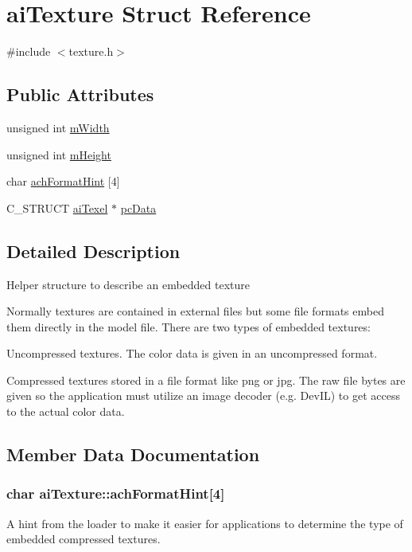 \hypertarget{structai_texture}{\section{ai\-Texture Struct Reference}
\label{structai_texture}
}


{\ttfamily \#include $<$texture.\-h$>$}

\subsection*{Public Attributes}
\begin{DoxyCompactItemize}
\item 
unsigned int \hyperlink{structai_texture_aaa3ad8cfe44fdc4dea2db91977d92234}{m\-Width}
\item 
unsigned int \hyperlink{structai_texture_ac1e2fa6f1f646e9c55e3985d4418a752}{m\-Height}
\item 
char \hyperlink{structai_texture_aa9f44996acf3b301bfeb4e5348311540}{ach\-Format\-Hint} \mbox{[}4\mbox{]}
\item 
C\-\_\-\-S\-T\-R\-U\-C\-T \hyperlink{structai_texel}{ai\-Texel} $\ast$ \hyperlink{structai_texture_aeb07528748b6e49d2d81c60006024f9a}{pc\-Data}
\end{DoxyCompactItemize}


\subsection{Detailed Description}
Helper structure to describe an embedded texture

Normally textures are contained in external files but some file formats embed them directly in the model file. There are two types of embedded textures\-:
\begin{DoxyEnumerate}
\item Uncompressed textures. The color data is given in an uncompressed format.
\item Compressed textures stored in a file format like png or jpg. The raw file bytes are given so the application must utilize an image decoder (e.\-g. Dev\-I\-L) to get access to the actual color data. 
\end{DoxyEnumerate}

\subsection{Member Data Documentation}
\hypertarget{structai_texture_aa9f44996acf3b301bfeb4e5348311540}{
\subsubsection[{ach\-Format\-Hint}]{\setlength{\rightskip}{0pt plus 5cm}char ai\-Texture\-::ach\-Format\-Hint\mbox{[}4\mbox{]}}}\label{structai_texture_aa9f44996acf3b301bfeb4e5348311540}
A hint from the loader to make it easier for applications to determine the type of embedded compressed textures.

